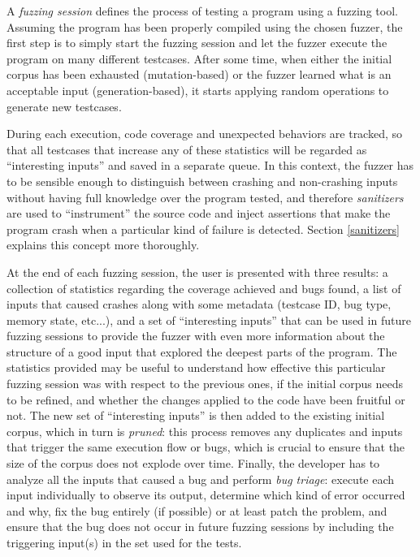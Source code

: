 \newpage
A \textit{fuzzing session} defines the process of testing a program using a fuzzing tool.
Assuming the program has been properly compiled using the chosen fuzzer, the first step is to simply start the fuzzing session and let the fuzzer execute the program on many different testcases. After some time, when either the initial corpus has been exhausted (mutation-based) or the fuzzer learned what is an acceptable input (generation-based), it starts applying random operations to generate new testcases. 

During each execution, code coverage and unexpected behaviors are tracked, so that all testcases that increase any of these statistics will be regarded as ``interesting inputs'' and saved in a separate queue. In this context, the fuzzer has to be sensible enough to distinguish between crashing and non-crashing inputs without having full knowledge over the program tested, and therefore \textit{sanitizers} are used to ``instrument'' the source code and inject assertions that make the program crash when a particular kind of failure is detected. Section \ref{sanitizers} explains this concept more thoroughly.

At the end of each fuzzing session, the user is presented with three results: a collection of statistics regarding the coverage achieved and bugs found, a list of inputs that caused crashes along with some metadata (testcase ID, bug type, memory state, etc...), and a set of ``interesting inputs'' that can be used in future fuzzing sessions to provide the fuzzer with even more information about the structure of a good input that explored the deepest parts of the program. 
The statistics provided may be useful to understand how effective this particular fuzzing session was with respect to the previous ones, if the initial corpus needs to be refined, and whether the changes applied to the code have been fruitful or not.
The new set of ``interesting inputs'' is then added to the existing initial corpus, which in turn is \textit{pruned}: this process removes any duplicates and inputs that trigger the same execution flow or bugs, which is crucial to ensure that the size of the corpus does not explode over time.
Finally, the developer has to analyze all the inputs that caused a bug and perform \textit{bug triage}: execute each input individually to observe its output, determine which kind of error occurred and why, fix the bug entirely (if possible) or at least patch the problem, and ensure that the bug does not occur in future fuzzing sessions by including the triggering input(s) in the set used for the tests.

